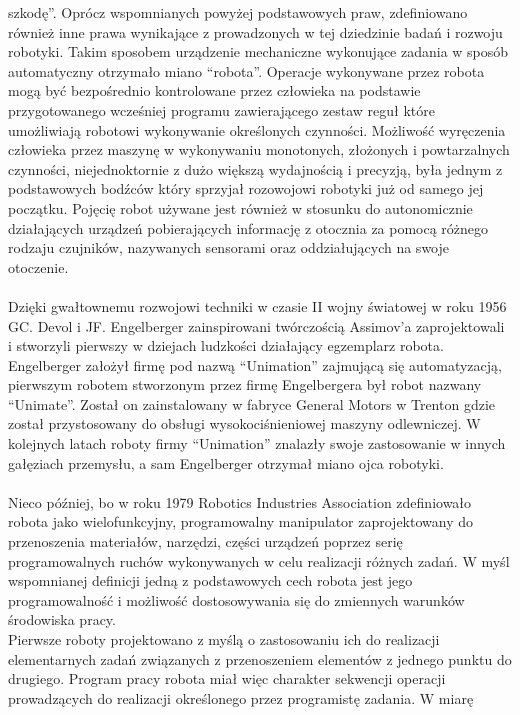 szkodę''. Oprócz wspomnianych powyżej podstawowych praw, zdefiniowano również
inne prawa wynikające z prowadzonych w tej dziedzinie badań i rozwoju
robotyki.
\newpage
Takim sposobem urządzenie mechaniczne wykonujące zadania w sposób automatyczny
otrzymało miano ``robota''.\cite{website:asimo-pl} Operacje wykonywane przez robota mogą być
bezpośrednio kontrolowane przez człowieka na podstawie przygotowanego wcześniej
programu zawierającego zestaw reguł które umożliwiają robotowi wykonywanie
określonych czynności. Możliwość wyręczenia człowieka przez maszynę w
wykonywaniu monotonych, złożonych i powtarzalnych czynności, niejednoktornie
z dużo większą wydajnością i precyzją, była jednym z podstawowych bodźców
który sprzyjał rozowojowi robotyki już od samego jej początku. Pojęcię robot
używane jest również w stosunku do autonomicznie działających urządzeń
pobierających informację z otocznia za pomocą różnego rodzaju czujników,
nazywanych sensorami oraz oddziałujących na swoje otoczenie. \\
\\
Dzięki gwałtownemu rozwojowi techniki w czasie II wojny światowej w roku 1956
GC. Devol i JF. Engelberger zainspirowani twórczością Assimov'a zaprojektowali i
stworzyli pierwszy w dziejach ludzkości działający egzemplarz robota\cite{website:robotyka-pl}.
Engelberger założył firmę pod nazwą ``Unimation'' zajmującą się automatyzacją,
pierwszym robotem stworzonym przez firmę Engelbergera był robot nazwany
``Unimate''. Został on zainstalowany w fabryce General Motors w Trenton gdzie
został przystosowany do obsługi wysokociśnieniowej maszyny odlewniczej. W
kolejnych latach roboty firmy ``Unimation'' znalazły swoje zastosowanie w innych
gałęziach przemysłu, a sam Engelberger otrzymał miano ojca robotyki.\\
\\
Nieco później, bo w roku 1979 Robotics Industries Association 
zdefiniowało robota jako wielofunkcyjny, programowalny manipulator
zaprojektowany do przenoszenia materiałów, narzędzi, części urządzeń poprzez
serię programowalnych ruchów wykonywanych w celu realizacji różnych zadań.
W myśl wspomnianej definicji jedną z podstawowych cech robota jest jego
programowalność i możliwość dostosowywania się do zmiennych warunków środowiska
pracy. \\
Pierwsze roboty projektowano z myślą o zastosowaniu ich do realizacji
elementarnych zadań związanych z przenoszeniem elementów z jednego punktu do
drugiego. Program pracy robota miał więc charakter sekwencji operacji
prowadzących do realizacji określonego przez programistę zadania. W miarę
